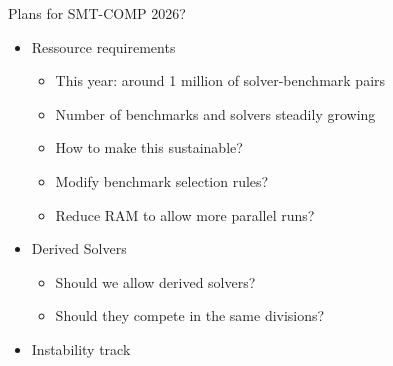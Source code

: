 \documentclass[table]{beamer}
\newcommand\vitem{\vfill\item}
\begin{document}
\begin{frame}{Plans for SMT-COMP 2026?}
  \begin{itemize}
    \item Ressource requirements
        \begin{itemize}
            \item This year: around 1 million of solver-benchmark pairs
            \item Number of benchmarks and solvers steadily growing
            \item How to make this sustainable?
            \item Modify benchmark selection rules?
            \item Reduce RAM to allow more parallel runs?
        \end{itemize}
    \item Derived Solvers
        \begin{itemize}
            \item Should we allow derived solvers?
            \item Should they compete in the same divisions?
        \end{itemize}
    \item Instability track


  \end{itemize}


\end{frame}

\end{document}
